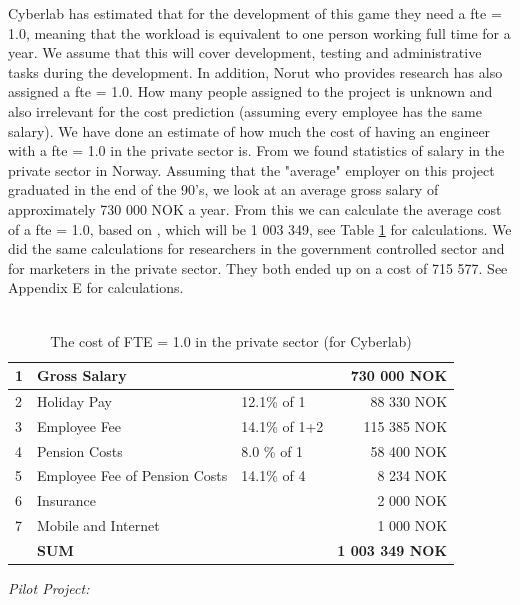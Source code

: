Cyberlab has estimated that for the development of this game they need a \ac{fte} = 1.0, meaning that the workload is equivalent to one person working full time for a year. We assume that this will cover development, testing and administrative tasks during the development. In addition, Norut who provides research has also assigned a \ac{fte} = 1.0. How many people assigned to the project is unknown and also irrelevant for the cost prediction (assuming every employee has the same salary). We have done an estimate of how much the cost of having an engineer with a \ac{fte} = 1.0 in the private sector is. From \cite{tekna} we found statistics of salary in the private sector in Norway. Assuming that the "average" employer on this project graduated in the end of the 90's, we look at an average gross salary of approximately 730 000 NOK a year. From this we can calculate the average cost of a \ac{fte} = 1.0, based on \cite{altinn}, which will be 1 003 349, see Table \ref{tab:costofFTE} for calculations. We did the same calculations for researchers in the government controlled sector and for marketers in the private sector. They both ended up on a cost of 715 577. See Appendix E for calculations.\\ \\
\begin{table}
\centering
    \caption[Cost of FTE = 1.0]{The cost of FTE = 1.0 in the private sector (for Cyberlab)}
    \begin{tabular}{|l|l|l|r|}
        \hline
       1&Gross Salary & & 730 000 NOK \\ \hline
       2&Holiday Pay & 12.1\% of 1  & 88 330 NOK \\ \hline
	   3&Employee Fee & 14.1\% of 1+2  & 115 385 NOK \\ \hline
	   4&Pension Costs & 8.0 \% of 1 & 58 400 NOK\\ \hline
	   5&Employee Fee of Pension Costs & 14.1\% of 4 & 8 234 NOK \\ \hline
	   6&Insurance & & 2 000 NOK \\ \hline
	   7&Mobile and Internet & & 1 000 NOK \\ \hline
	   & \textbf{SUM} & & \textbf{1 003 349 NOK} \\
	    \hline
    \end{tabular}
    \label{tab:costofFTE}
\end{table}
\emph{Pilot Project:}\\
